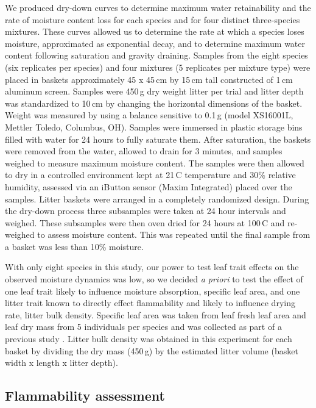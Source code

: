 \documentclass[letterpaper,12pt]{article}
\begin{document}
We produced dry-down curves to determine maximum water retainability and the
rate of moisture content loss for each species and for four distinct
three-species mixtures. These curves allowed us to determine the rate at which
a species loses moisture, approximated as exponential decay, and to determine
maximum water content following saturation and gravity draining. Samples from
the eight species (six replicates per species) and four mixtures (5 replicates
per mixture type) were placed in baskets approximately 45 x 45\,cm by 15\,cm
tall constructed of 1\,cm aluminum screen. Samples were 450\,g dry weight
litter per trial and litter depth was standardized to 10\,cm by changing the
horizontal dimensions of the basket. Weight was measured by using a balance
sensitive to 0.1\,g (model XS16001L, Mettler Toledo, Columbus, OH). Samples
were immersed in plastic storage bins filled with water for 24 hours to fully
saturate them. After saturation, the baskets were removed from the water,
allowed to drain for 3 minutes, and samples weighed to measure maximum moisture
content. The samples were then allowed to dry in a controlled environment kept
at 21\,C temperature and 30\% relative humidity, assessed via an iButton sensor
(Maxim Integrated) placed over the samples. Litter baskets were arranged in a
completely randomized design. During the dry-down process three subsamples were
taken at 24 hour intervals and weighed. These subsamples were then oven dried
for 24 hours at 100\,C and re-weighed to assess moisture content. This was
repeated until the final sample from a basket was less than 10\% moisture.

With only eight species in this study, our power to test leaf trait effects on
the observed moisture dynamics was low, so we decided \emph{a priori} to test
the effect of one leaf trait likely to influence moisture absorption, specific
leaf area, and one litter trait known to directly effect flammability and
likely to influence drying rate, litter bulk density. Specific leaf area was
taken from leaf fresh leaf area and leaf dry mass from 5 individuals per
species and was collected as part of a previous study
\citep{Magalhaes+Schwilk-2012}. Litter bulk density was obtained in this
experiment for each basket by dividing the dry mass (450\,g) by the estimated
litter volume (basket width x length x litter depth).

\subsection*{Flammability assessment}
\end{document}
